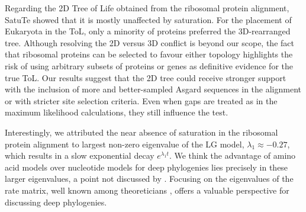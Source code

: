 \medskip

Regarding the 2D Tree of Life obtained from the ribosomal protein alignment, SatuTe showed that it is mostly unaffected by saturation.
For the placement of Eukaryota in the ToL, only a minority of proteins preferred the 3D-rearranged tree. Although resolving the 2D versus 3D conflict is beyond our scope, the fact that ribosomal proteins can be selected to favour either topology highlights the risk of using arbitrary subsets of proteins or genes as definitive evidence for the true ToL. Our results suggest that the 2D tree could receive stronger support with the inclusion of more and better-sampled Asgard sequences in the alignment or with stricter site selection criteria. Even when gaps are treated as in the maximum likelihood calculations, they still influence the test.

\medskip

Interestingly, we attributed the near absence of saturation in the ribosomal protein alignment to largest non-zero eigenvalue of the LG model, $\lambda_1 \approx -0.27$,  which results in a slow exponential decay $e^{\lambda_1 t}$. We think the advantage of amino acid models over nucleotide models for deep phylogenies lies precisely in these larger eigenvalues, a point not discussed by . Focusing on the eigenvalues of the rate matrix, well known among theoreticians , offers a valuable perspective for discussing deep phylogenies.

\medskip






